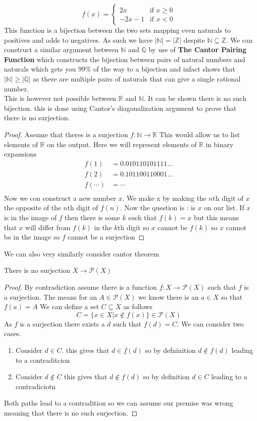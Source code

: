 \documentclass{article}
\begin{document}
    \[f(x) = \begin{cases}
        2x & \text{if } x \ge 0 \\
        -2x-1 & \text{if } x < 0
    \end{cases}\]
This function is a bijection between the two sets mapping even naturals to positives and odds to negatives. As such we have $|\mathbb{N}| = |\mathbb{Z}|$ despite $\mathbb{N} \subseteq \mathbb{Z}$. We can construct a similar argument between $\mathbb{N}$ and $\mathbb{Q}$ by use of \textbf{The Cantor Pairing Function} which constructs the bijection between pairs of natural numbers and naturals which gets you 99\% of the way to a bijection and infact shows that $|\mathbb{N}| \ge |\mathbb{Q}|$ as there are multiple pairs of naturals that can give a single rational number.
\\
This is however not possible between $\mathbb{R}$ and $\mathbb{N}$. It can be shown there is no such bijection. this is done using Cantor's diagonalization argument to prove that there is no surjection. 
\begin{proof}
    Assume that theres is a surjection $f:\mathbb{N}\to \mathbb{R}$ This would allow us to list elements of $\mathbb{R}$ on the output. Here we will represent elements of $\mathbb{R}$ in binary expansions
    \begin{align*}
        f(1) &= 0.010110101111\dots \\
        f(2) &= 0.101100110001\dots \\
        f(\cdots) &= \cdots \\
    \end{align*}
    Now we con construct a new number $x$. We make x by making the $n$th digit of $x$ the opposite of the $n$th digit of $f(n)$. Now the question is : is $x$ on our list. If $x$ is in the image of $f$ then there is some $k$ such that $f(k) = x$ but this means that $x$ will differ from $f(k)$ in the $k$th digit so $x$ cannot be $f(k)$ so $x$ cannot be in the image so $f$ cannot be a surjection
\end{proof}
We can also very similarly consider cantor theorem
\begin{proposition}
    There is no surjection $X \to \mathcal{P}(X)$
\end{proposition}
\begin{proof}
    By contradiction assume there is a function $f : X \to \mathcal{P}(X)$ such that $f$ is a surjection.  The means for an $A \in \mathcal{P}(X)$ we know there is an $a \in X$ so that $f(a) = A$ We can define a set $C \subseteq X$ as follows
    \[C = \{x \in X | x \notin f(x)\} \in \mathcal{P}(X)\]
    As $f$ is a surjection there exists a $d$ such that $f(d) = C$. We can consider two cases.
    \begin{enumerate}
        \item Consider $d \in C$. this gives that $d \in f(d)$ so by defninition $d \notin f(d)$ leading to a contraditcion
        \item Consider $d \notin C$ this gives that $d \notin f(d)$ so by definition $d \in C$ leading to a contradiciotn
    \end{enumerate}
    Both paths lead to a contradition so we can assume our premise was wrong meaning that there is no such surjection.
\end{proof}
\end{document}
